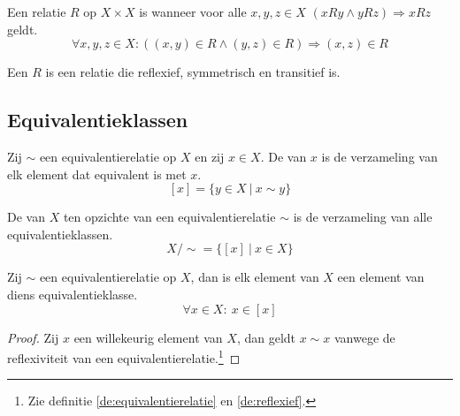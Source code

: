 \documentclass[main.tex]{subfiles}
\begin{document}
\begin{de}
  \label{de:transitief}
  Een relatie $R$ op $X \times X$ is  wanneer voor alle $x,y,z\in X$ $(xRy \wedge yRz) \Rightarrow xRz$ geldt.
  \[ \forall x,y,z \in X: ((x,y) \in R \wedge (y,z) \in R) \Rightarrow (x,z) \in R\]
\end{de}

\begin{de}
  \label{de:equivalentierelatie}
  Een  $R$ is een relatie die reflexief, symmetrisch en transitief is.
\end{de}

\subsection{Equivalentieklassen}
\label{sec:equivalentieklassen}

\begin{de}
  Zij $\sim$ een equivalentierelatie op $X$ en zij $x \in X$.
  De  van $x$ is de verzameling van elk element dat equivalent is met $x$.
  \[ [x] = \{ y \in X\ |\ x \sim y \} \]
\end{de}

\begin{de}
  De  van $X$ ten opzichte van een equivalentierelatie $\sim$ is de verzameling van alle equivalentieklassen.
  \[ X/\sim = \{[x] \ |\ x \in X \}\]
\end{de}

\begin{st}
  \label{st:element-in-equivalentieklasse}
  Zij $\sim$ een equivalentierelatie op $X$, dan is elk element van $X$ een element van diens equivalentieklasse.
  \[ \forall x \in X:\ x \in [x] \]
  
  \begin{proof}
    Zij $x$ een willekeurig element van $X$, dan geldt $x \sim x$ vanwege de reflexiviteit van een equivalentierelatie.\footnote{Zie definitie \ref{de:equivalentierelatie} en \ref{de:reflexief}.}
  \end{proof}
\end{st}
\end{document}
